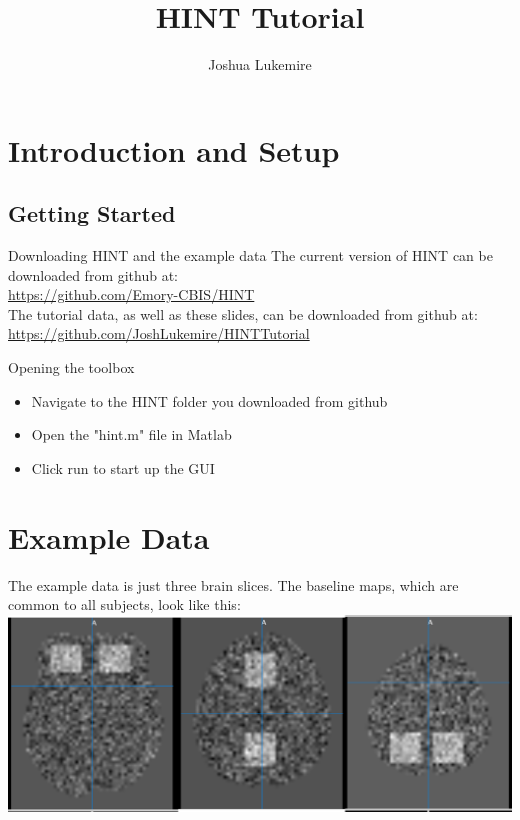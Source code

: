 \documentclass[11pt]{beamer}
\author{Joshua Lukemire}
\title{HINT Tutorial}
\begin{document}
\begin{frame}
\titlepage
\end{frame}

\begin{frame}
\tableofcontents
\end{frame}

\section{Introduction and Setup}

\subsection{Getting Started}

\begin{frame}{Downloading HINT and the example data}
The current version of HINT can be downloaded from github at:\\
\url{https://github.com/Emory-CBIS/HINT} \\
\medskip
The tutorial data, as well as these slides, can be downloaded from github at:\\
\url{https://github.com/JoshLukemire/HINTTutorial}
\end{frame}

\begin{frame}{Opening the toolbox}
\begin{itemize}
\item Navigate to the HINT folder you downloaded from github
\item Open the "hint.m" file in Matlab
\item Click run to start up the GUI
\end{itemize}
\end{frame}

\section{Example Data}

\begin{frame}
The example data is just three brain slices. The baseline maps, which are common to all subjects, look like this:
		\includegraphics[width=1\linewidth]{figs/baselineTruth}
\end{frame}
\end{document}
